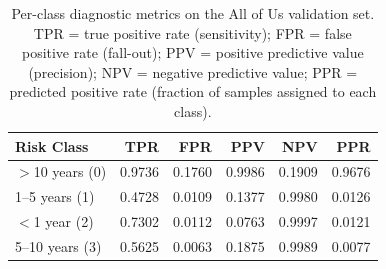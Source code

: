 \documentclass{article}
\begin{document}

\begin{table}
\caption{Per-class precision, recall, and F1-score for BEHRT-LoRA, XGBoost, and Neural Network 
on the All of Us held-out test set, grouped by clinical risk category. 
BEHRT-LoRA evaluated on a stratified 50K subsample; XGBoost and NN on the full test set ($N=98{,}249$).}
\label{tab:aou_perclass_comparison}
\end{table}
\begin{table}[h]
\caption{Per-class diagnostic metrics on the All of Us validation set. TPR = true positive rate (sensitivity); FPR = false positive rate (fall-out); PPV = positive predictive value (precision); NPV = negative predictive value; PPR = predicted positive rate (fraction of samples assigned to each class).}
\label{tab:aou_diagnostic}
\begin{adjustbox}{max width=\textwidth}
\begin{tabular}{lrrrrr}
\toprule
Risk Class & TPR & FPR & PPV & NPV & PPR \\
\midrule
$>$10 years (0) & 0.9736 & 0.1760 & 0.9986 & 0.1909 & 0.9676 \\
1--5 years (1)  & 0.4728 & 0.0109 & 0.1377 & 0.9980 & 0.0126 \\
$<$1 year (2)   & 0.7302 & 0.0112 & 0.0763 & 0.9997 & 0.0121 \\
5--10 years (3) & 0.5625 & 0.0063 & 0.1875 & 0.9989 & 0.0077 \\
\bottomrule
\end{tabular}
\end{adjustbox}
\end{table}
\end{document}
